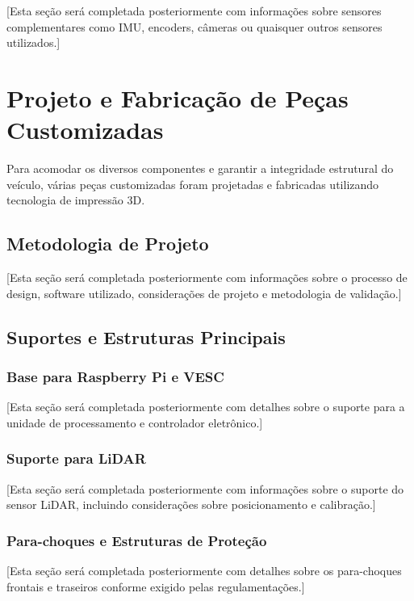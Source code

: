 [Esta seção será completada posteriormente com informações sobre sensores complementares como IMU, encoders, câmeras ou quaisquer outros sensores utilizados.]

\section{Projeto e Fabricação de Peças Customizadas}

Para acomodar os diversos componentes e garantir a integridade estrutural do
veículo, várias peças customizadas foram projetadas e fabricadas utilizando
tecnologia de impressão 3D.

\subsection{Metodologia de Projeto}

[Esta seção será completada posteriormente com informações sobre o processo de design, software utilizado, considerações de projeto e metodologia de validação.]

\subsection{Suportes e Estruturas Principais}

\subsubsection{Base para Raspberry Pi e VESC}

[Esta seção será completada posteriormente com detalhes sobre o suporte para a unidade de processamento e controlador eletrônico.]

\subsubsection{Suporte para LiDAR}

[Esta seção será completada posteriormente com informações sobre o suporte do sensor LiDAR, incluindo considerações sobre posicionamento e calibração.]

\subsubsection{Para-choques e Estruturas de Proteção}

[Esta seção será completada posteriormente com detalhes sobre os para-choques frontais e traseiros conforme exigido pelas regulamentações.]

